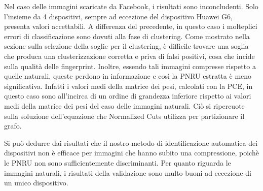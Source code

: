 Nel caso delle immagini scaricate da Facebook, i risultati sono inconcludenti. Solo l'insieme da 4 dispositivi, sempre ad eccezione del dispositivo Huawei G6, presenta valori accettabili. A differenza del precedente, in questo caso i molteplici errori di classificazione sono dovuti alla fase di clustering. Come mostrato nella sezione sulla selezione della soglie per il clustering, è difficile trovare una soglia che produca una clusterizzazione corretta e priva di falsi positivi, cosa che incide sulla qualità delle fingerprint. Inoltre, essendo tali immagini compresse rispetto a quelle naturali, queste perdono in informazione e così la PNRU estratta è meno significativa. Infatti i valori medi della matrice dei pesi, calcolati con la PCE,  in questo caso sono all'incirca di un ordine di grandezza inferiore rispetto ai valori medi della matrice dei pesi del caso delle immagini naturali. Ciò si ripercuote sulla soluzione dell'equazione che Normalized Cuts utilizza per partizionare il grafo.

Si può dedurre dai risultati che il nostro metodo di identificazione automatica dei dispositivi non è efficace per immagini che hanno subito una compressione, poichè le PNRU non sono sufficientemente discriminanti. Per quanto riguarda le immagini naturali, i risultati della validazione sono multo buoni ad eccezione di un unico dispositivo.